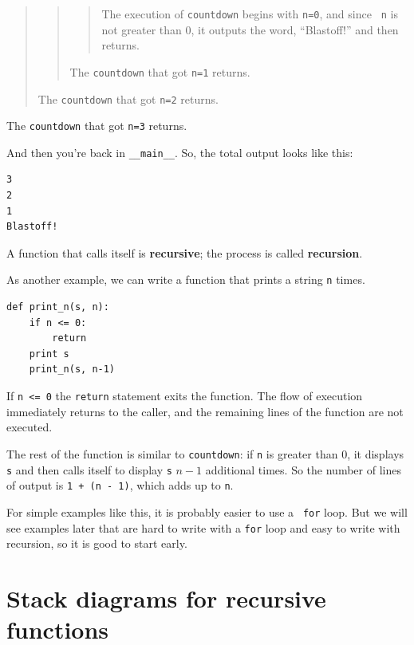 \documentclass[10pt]{book}
\begin{document}
\begin{CJK}{UTF8}{gbsn}
\begin{quote}
\begin{quote}
\begin{quote}
The execution of {\tt countdown} begins with {\tt n=0}, and since {\tt
n} is not greater than 0, it outputs the word, ``Blastoff!'' and then
returns.
\end{quote}

The {\tt countdown} that got {\tt n=1} returns.
\end{quote}

The {\tt countdown} that got {\tt n=2} returns.
\end{quote}

The {\tt countdown} that got {\tt n=3} returns.

And then you're back in \verb"__main__".  So, the
total output looks like this:

\begin{verbatim}
3
2
1
Blastoff!
\end{verbatim}
%
A function that calls itself is {\bf recursive}; the process is
called {\bf recursion}.

As another example, we can write a function that prints a
string {\tt n} times.

\begin{verbatim}
def print_n(s, n):
    if n <= 0:
        return
    print s
    print_n(s, n-1)
\end{verbatim}
%
If {\tt n <= 0} the {\tt return} statement exits the function.  The
flow of execution immediately returns to the caller, and the remaining
lines of the function are not executed.

The rest of the function is similar to {\tt countdown}: if {\tt n} is
greater than 0, it displays {\tt s} and then calls itself to display
{\tt s} $n-1$ additional times.  So the number of lines of output
is {\tt 1 + (n - 1)}, which adds up to
{\tt n}.

For simple examples like this, it is probably easier to use a {\tt
for} loop.  But we will see examples later that are hard to write
with a {\tt for} loop and easy to write with recursion, so it is
good to start early.



\section{Stack diagrams for recursive functions}
\label{recursive.stack}


\end{CJK}
\end{document}
